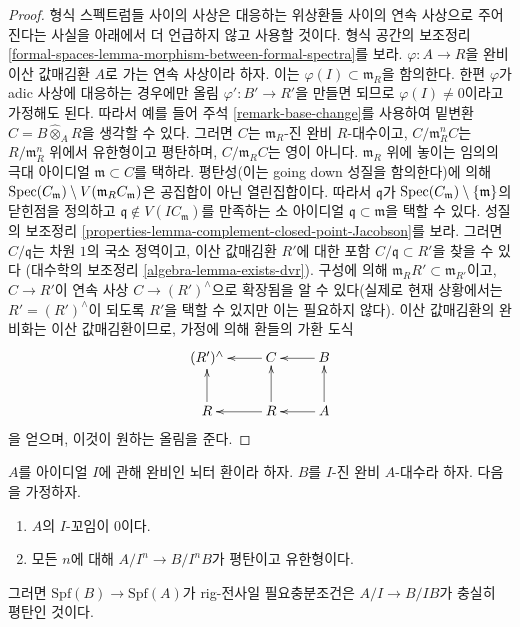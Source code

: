 \begin{proof}
형식 스펙트럼들 사이의 사상은 대응하는 위상환들 사이의 연속 사상으로
주어진다는 사실을 아래에서 더 언급하지 않고 사용할 것이다. 형식 공간의
보조정리 \ref{formal-spaces-lemma-morphism-between-formal-spectra}를 보라.
$\varphi : A \to R$을 완비 이산 값매김환 $A$로 가는 연속 사상이라 하자.
이는 $\varphi(I) \subset \mathfrak m_R$을 함의한다. 한편 $\varphi$가 adic
사상에 대응하는 경우에만 올림
$\varphi' : B' \to R'$을 만들면 되므로 $\varphi(I) \not = 0$이라고
가정해도 된다. 따라서 예를 들어 주석 \ref{remark-base-change}를 사용하여
밑변환 $C = B \widehat{\otimes}_A R$을 생각할 수 있다.
그러면 $C$는 $\mathfrak m_R$-진 완비 $R$-대수이고,
$C/\mathfrak m_R^n C$는 $R/\mathfrak m_R^n$ 위에서 유한형이고 평탄하며,
$C/\mathfrak m_R C$는 영이 아니다. $\mathfrak m_R$ 위에 놓이는 임의의
극대 아이디얼 $\mathfrak m \subset C$를 택하라. 평탄성(이는 going down
성질을 함의한다)에 의해
$\mathop{\mathrm{Spec}}(C_\mathfrak m) \setminus V(\mathfrak m_R C_\mathfrak m)$은
공집합이 아닌 열린집합이다. 따라서
$\mathfrak q$가 $\mathop{\mathrm{Spec}}(C_\mathfrak m) \setminus \{\mathfrak m\}$의
닫힌점을 정의하고 $\mathfrak q \not \in V(IC_\mathfrak m)$를 만족하는
소 아이디얼 $\mathfrak q \subset \mathfrak m$을 택할 수 있다. 성질의
보조정리 \ref{properties-lemma-complement-closed-point-Jacobson}를 보라.
그러면 $C/\mathfrak q$는 차원 $1$의 국소 정역이고, 이산 값매김환 $R'$에
대한 포함 $C/\mathfrak q \subset R'$을 찾을 수 있다
(대수학의 보조정리 \ref{algebra-lemma-exists-dvr}). 구성에 의해
$\mathfrak m_R R' \subset \mathfrak m_{R'}$이고, $C \to R'$이 연속 사상
$C \to (R')^\wedge$으로 확장됨을 알 수 있다(실제로 현재 상황에서는
$R' = (R')^\wedge$이 되도록 $R'$을 택할 수 있지만 이는 필요하지 않다).
이산 값매김환의 완비화는 이산 값매김환이므로, 가정에 의해 환들의 가환 도식
$$
\xymatrix{
(R')^\wedge & C \ar[l] & B \ar[l] \\
R \ar[u] & R \ar[l] \ar[u] & A \ar[l] \ar[u]
}
$$
을 얻으며, 이것이 원하는 올림을 준다.
\end{proof}

\begin{lemma}
\label{lemma-flat-rig-surjective}
$A$를 아이디얼 $I$에 관해 완비인 뇌터 환이라 하자.
$B$를 $I$-진 완비 $A$-대수라 하자. 다음을 가정하자.
\begin{enumerate}
\item $A$의 $I$-꼬임이 $0$이다.
\item 모든 $n$에 대해 $A/I^n \to B/I^nB$가 평탄이고 유한형이다.
\end{enumerate}
그러면 $\text{Spf}(B) \to \text{Spf}(A)$가 rig-전사일 필요충분조건은
$A/I \to B/IB$가 충실히 평탄인 것이다.
\end{lemma}

